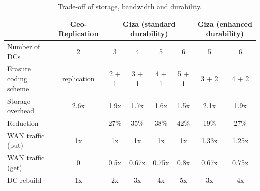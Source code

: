 %
%


\begin{table}[tp]
\centering
\begin{tabular}{|l||c||c|c|c|c||c|c|}
\hline
				& Geo-Replication    	& \multicolumn{4}{c||}{Giza (standard durability)}		& \multicolumn{2}{c|}{Giza (enhanced durability)}
\\ \hline \hline
Number of DCs 				& 2										& 3 & 4 & 5 & 6									& 5 & 6
\\ \hline
Erasure coding scheme & replication					& 2 + 1 & 3 + 1 & 4 + 1 & 5 + 1	& 3 + 2 & 4 + 2
\\ \hline \hline
Storage overhead			& 2.6x								& 1.9x & 1.7x & 1.6x & 1.5x			& 2.1x & 1.9x
\\ \hline
Reduction							& -										& 27\% & 35\% & 38\% & 42\%			& 19\% & 27\%
\\ \hline \hline
WAN traffic (put)			& 1x									& 1x & 1x & 1x & 1x 						& 1.33x & 1.25x
\\ \hline
WAN traffic (get)			& 0										& 0.5x & 0.67x & 0.75x & 0.8x		& 0.67x & 0.75x
\\ \hline
DC rebuild 						& 1x									& 2x & 3x & 4x & 5x 						& 3x & 4x
\\ \hline \hline
\end{tabular}
\caption{Trade-off of storage, bandwidth and durability.}
\label{tab:cost_benefit}
\end{table}


